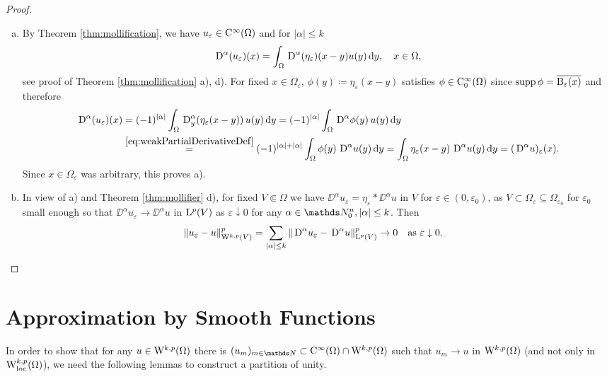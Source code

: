 \begin{proof}
  \begin{enumerate}[a)]
    \item By Theorem \ref{thm:mollification}, we have $u_\varepsilon \in \mathrm{C}^\infty(\Omega)$ and for $|\alpha| \leq k$
  $$
  \,{\operatorname{D}}^\alpha (u_\varepsilon)(x) = \int_\Omega \,{\operatorname{D}}^\alpha (\eta_\varepsilon)(x - y) u(y) \, {\operatorname{d}\!{y}}, \quad x \in \Omega,
  $$
    see proof of Theorem \ref{thm:mollification} a), d).
    For fixed $x \in \Omega_\varepsilon$, $\phi(y) \coloneqq \eta_\varepsilon(x - y)$ satisfies $\phi \in \mathrm{C}_0^\infty(\Omega)$ since $\operatorname{supp} \phi = \overline{\mathrm{B}_\varepsilon(x)}$ and therefore
    \begin{align*}
      \,{\operatorname{D}}^\alpha (u_\varepsilon)(x) 
      &= (-1)^{|\alpha|} \int_\Omega \,{\operatorname{D}}_y^\alpha (\eta_\varepsilon (x - y))\, u(y) \, {\operatorname{d}\!{y}}
      = (-1)^{|\alpha|} \int_\Omega \,{\operatorname{D}}^\alpha \phi(y) \, u(y) \, {\operatorname{d}\!{y}} \\
      &\overset{\eqref{eq:weakPartialDerivativeDef}}{=} (-1)^{|\alpha| + |\alpha|} \int_\Omega \phi(y) \, \,{\operatorname{D}}^\alpha u(y) \, {\operatorname{d}\!{y}}
      = \int_\Omega \eta_\varepsilon(x - y)\, \,{\operatorname{D}}^\alpha u(y) \, {\operatorname{d}\!{y}}
      = (\,{\operatorname{D}}^\alpha u)_\varepsilon(x).
    \end{align*}
    Since $x \in \Omega_\varepsilon$ was arbitrary, this proves a).

  \item In view of a) and Theorem \ref{thm:mollifier} d), for fixed $V \Subset \Omega$ we have $\DD^\alpha u_\varepsilon = \eta_\varepsilon \ast \DD^\alpha u$ in $V$ for $\varepsilon \in (0,\varepsilon_0)$, as $V \subset \Omega_\varepsilon \subseteq \Omega_{\varepsilon_0}$ for $\varepsilon_0$ small enough so that $\DD^\alpha u_\varepsilon \to \DD^\alpha u$ in $\mathrm{L}^p(V)$ as $\varepsilon \downarrow 0$ for any $\alpha \in \N_0^n, |\alpha| \leq k$.
     Then
     \begin{align*}
     \|u_\varepsilon - u\|^p_{\mathrm{W}^{k,p}(V)} = \sum_{|\alpha| \leq k} \|\,{\operatorname{D}}^\alpha u_\varepsilon - \,{\operatorname{D}}^\alpha u\|_{\mathrm{L}^p(V)}^p \to 0 \quad\text{as } \varepsilon \downarrow 0. &\qedhere
   \end{align*}
 \end{enumerate}
\end{proof}

\section{Approximation by Smooth Functions}

In order to show that for any $u \in \mathrm{W}^{k,p}(\Omega)$ there is $(u_m)_{m \in \N} \subset \CC^\infty(\Omega) \cap \WW^{k,p}(\Omega)$ such that $u_m \to u$ in $\mathrm{W}^{k,p}(\Omega)$ (and not only in $\mathrm{W}^{k,p}_{\operatorname{loc}}(\Omega)$), we need the following lemmas to construct a partition of unity.

